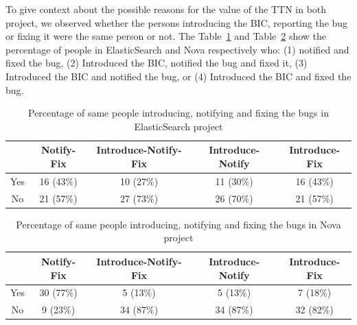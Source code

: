 \documentclass[10pt, conference]{IEEEtran}
\begin{document}

To give context about the possible reasons for the value of the TTN in both project, we observed whether the persons introducing the BIC, reporting the bug or fixing it were the same person or not. The Table~\ref{tableII} and Table~\ref{tableIII} show the percentage of people in ElasticSearch and Nova respectively who: (1) notified and fixed the bug, (2) Introduced the BIC, notified the bug and fixed it, (3) Introduced the BIC and notified the bug, or (4) Introduced the BIC and fixed the bug.
\begin{table}[!t]
\renewcommand{\arraystretch}{1.3}
\label{tableII}
\centering
\caption{Percentage of same people introducing, notifying and fixing the bugs in ElasticSearch project}
\begin{tabular}{|c||c||c||c||c| }
\hline
  & Notify-Fix & Introduce-Notify-Fix & Introduce-Notify & Introduce-Fix \\
\hline
Yes & 16 (43\%) & 10 (27\%) & 11 (30\%) & 16 (43\%) \\
\hline
No & 21 (57\%) & 27 (73\%) & 26 (70\%) & 21 (57\%) \\
\hline
\end{tabular}
\end{table}

\begin{table}[!t]
\renewcommand{\arraystretch}{1.3}
\label{tableIII}
\centering
\caption{Percentage of same people introducing, notifying and fixing the bugs in Nova project}
\begin{tabular}{|c||c||c||c||c| }
\hline
  & Notify-Fix & Introduce-Notify-Fix & Introduce-Notify & Introduce-Fix \\
\hline
Yes & 30 (77\%) & 5 (13\%) & 5 (13\%) & 7 (18\%) \\
\hline
No & 9 (23\%) & 34 (87\%) & 34 (87\%) & 32 (82\%) \\
\hline
\end{tabular}
\end{table}
\end{document}
